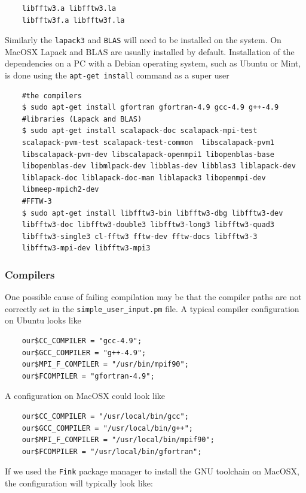 \documentclass[a4paper,11pt]{article}
\begin{document}
\begin{verbatim}
    libfftw3.a libfftw3.la
    libfftw3f.a libfftw3f.la
\end{verbatim}

Similarly the \texttt{lapack3} and \texttt{BLAS} will need to be installed on the system. On MacOSX Lapack and BLAS are usually installed by default. Installation of the dependencies on a PC with a Debian operating system, such as Ubuntu or Mint, is done using the \texttt{apt-get install} command as a super user
\begin{verbatim}
    #the compilers
    $ sudo apt-get install gfortran gfortran-4.9 gcc-4.9 g++-4.9
    #libraries (Lapack and BLAS)
    $ sudo apt-get install scalapack-doc scalapack-mpi-test
    scalapack-pvm-test scalapack-test-common  libscalapack-pvm1
    libscalapack-pvm-dev libscalapack-openmpi1 libopenblas-base
    libopenblas-dev libmlpack-dev libblas-dev libblas3 liblapack-dev
    liblapack-doc liblapack-doc-man liblapack3 libopenmpi-dev
    libmeep-mpich2-dev
    #FFTW-3
    $ sudo apt-get install libfftw3-bin libfftw3-dbg libfftw3-dev
    libfftw3-doc libfftw3-double3 libfftw3-long3 libfftw3-quad3
    libfftw3-single3 cl-fftw3 fftw-dev fftw-docs libfftw3-3
    libfftw3-mpi-dev libfftw3-mpi3 
\end{verbatim}

\subsubsection{Compilers}

One possible cause of failing compilation may be that the compiler paths are not correctly set in the \texttt{simple\_user\_input.pm} file. A typical compiler configuration on Ubuntu looks like
\begin{verbatim}
    our$CC_COMPILER = "gcc-4.9";
    our$GCC_COMPILER = "g++-4.9";
    our$MPI_F_COMPILER = "/usr/bin/mpif90";
    our$FCOMPILER = "gfortran-4.9";
\end{verbatim}
A configuration on MacOSX could look like
\begin{verbatim}
    our$CC_COMPILER = "/usr/local/bin/gcc";
    our$GCC_COMPILER = "/usr/local/bin/g++";
    our$MPI_F_COMPILER = "/usr/local/bin/mpif90";
    our$FCOMPILER = "/usr/local/bin/gfortran";
\end{verbatim}

If we used the \texttt{Fink} package manager to install the GNU toolchain on MacOSX, the configuration will typically look like:
\end{document}
